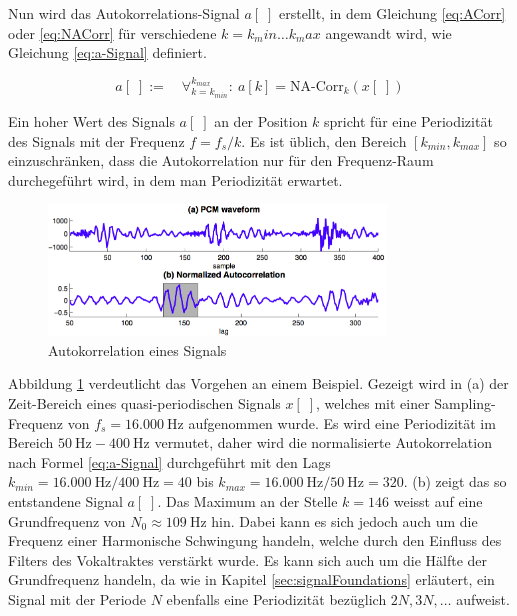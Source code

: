 Nun wird das Autokorrelations-Signal $a[\;]$ erstellt, in dem Gleichung \ref{eq:ACorr} oder \ref{eq:NACorr} für verschiedene $k = k_min \ldots k_max$ angewandt wird, wie Gleichung \ref{eq:a-Signal} definiert. 

\begin{equation}
a[\;] := \quad \mathop{\forall}_{k = k_{min}}^{k_{max}} :\ a[k] = \text{NA-Corr}_k(x[\;]) 
\label{eq:a-Signal}
\end{equation}

Ein hoher Wert des Signals $a[\;]$ an der Position $k$ spricht für eine Periodizität des Signals mit der Frequenz $f =  f_s / k $. Es ist üblich, den Bereich $[k_{min},k_{max}]$ so einzuschränken, dass die Autokorrelation nur für den Frequenz-Raum durchegeführt wird, in dem man Periodizität erwartet. 

\begin{figure}[h!]
	\centering
	\includegraphics[width=0.8\textwidth]{bilder/acorr.png}
	\caption{Autokorrelation eines Signals}
	\label{img:acorr}
\end{figure}	

Abbildung \ref{img:acorr} verdeutlicht das Vorgehen an einem Beispiel. Gezeigt wird  in (a) der Zeit-Bereich eines quasi-periodischen Signals $x[\;]$, welches mit einer Sampling-Frequenz von $f_s = \SI{16.000}{\hertz}$ aufgenommen wurde. Es wird eine Periodizität im Bereich $\SI{50}{\hertz} - \SI{400}{\hertz}$ vermutet, daher wird die normalisierte Autokorrelation nach Formel \ref{eq:a-Signal} durchgeführt mit den Lags $k_{min} = \SI{16.000}{\hertz} / \SI{400}{\hertz} = 40$ bis $k_{max} = \SI{16.000}{\hertz} / \SI{50}{\hertz} = 320$. (b) zeigt das so entstandene Signal $a[\;]$. Das Maximum an der Stelle $k = 146$ weisst auf eine Grundfrequenz von $N_0 \approx \SI{109}{\hertz}$ hin. Dabei kann es sich jedoch auch um die Frequenz einer Harmonische Schwingung handeln, welche durch den Einfluss des Filters des Vokaltraktes verstärkt wurde. Es kann sich auch um die Hälfte der Grundfrequenz handeln, da wie in Kapitel \ref{sec:signalFoundations} erläutert, ein Signal mit der Periode $N$ ebenfalls eine Periodizität bezüglich $2N, 3N,\ldots$ aufweist. \cite{vad_Lisboa} \cite[S. 24]{dspMichigan}

